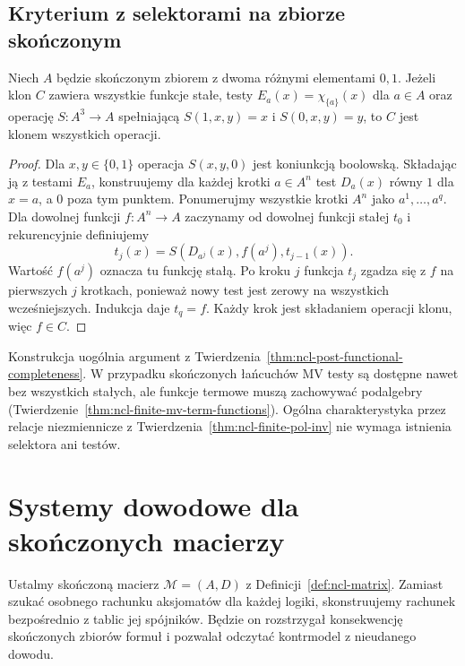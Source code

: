 \subsection{Kryterium z selektorami na zbiorze skończonym}
\begin{twierdzenie}
\label{thm:ncl-finite-selector-completeness}
Niech $A$ będzie skończonym zbiorem z dwoma różnymi
elementami $0,1$. Jeżeli klon $C$ zawiera wszystkie
funkcje stałe, testy $E_a(x)=\chi_{\{a\}}(x)$
dla $a\in A$ oraz operację $S:A^3\to A$
spełniającą $S(1,x,y)=x$ i $S(0,x,y)=y$,
to $C$ jest klonem wszystkich operacji.
\end{twierdzenie}
\begin{proof}
Dla $x,y\in\{0,1\}$ operacja $S(x,y,0)$ jest
koniunkcją boolowską. Składając ją z testami $E_a$,
konstruujemy dla każdej krotki $a\in A^n$ test
$D_a(x)$ równy $1$ dla $x=a$, a $0$ poza tym punktem.
Ponumerujmy wszystkie krotki $A^n$ jako $a^1,\ldots,a^q$.
Dla dowolnej funkcji $f:A^n\to A$ zaczynamy
od dowolnej funkcji stałej $t_0$ i rekurencyjnie
definiujemy
\[
 t_j(x)=S(D_{a^j}(x),f(a^j),t_{j-1}(x)).
\]
Wartość $f(a^j)$ oznacza tu funkcję stałą.
Po kroku $j$ funkcja $t_j$ zgadza się z $f$
na pierwszych $j$ krotkach, ponieważ nowy test
jest zerowy na wszystkich wcześniejszych.
Indukcja daje $t_q=f$. Każdy krok jest składaniem
operacji klonu, więc $f\in C$.
\end{proof}
Konstrukcja uogólnia argument z
Twierdzenia~\ref{thm:ncl-post-functional-completeness}.
W przypadku skończonych łańcuchów MV testy są dostępne
nawet bez wszystkich stałych, ale funkcje termowe
muszą zachowywać podalgebry
(Twierdzenie~\ref{thm:ncl-finite-mv-term-functions}).
Ogólna charakterystyka przez relacje niezmiennicze
z Twierdzenia~\ref{thm:ncl-finite-pol-inv} nie wymaga
istnienia selektora ani testów.

\section{Systemy dowodowe dla skończonych macierzy}

Ustalmy skończoną macierz $\mathcal M=(A,D)$
z Definicji~\ref{def:ncl-matrix}. Zamiast szukać osobnego
rachunku aksjomatów dla każdej logiki, skonstruujemy
rachunek bezpośrednio z tablic jej spójników.
Będzie on rozstrzygał konsekwencję skończonych
zbiorów formuł i pozwalał odczytać kontrmodel
z nieudanego dowodu.

